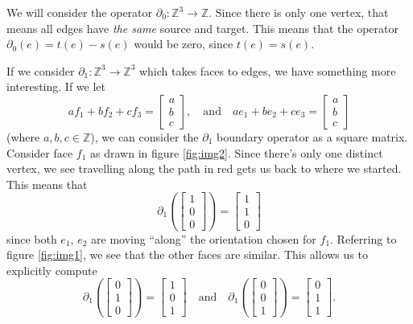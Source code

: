 We will consider the operator
$\partial_{0}:\mathbb{Z}^{3}\to\mathbb{Z}$. Since there is only
one vertex, that means all edges have \emph{the same} source and
target. This means that the operator $\partial_{0}(e)=t(e)-s(e)$
would be zero, since $t(e)=s(e)$.

If we consider $\partial_{1}:\mathbb{Z}^{3}\to\mathbb{Z}^{3}$
which takes faces to edges, we have something more interesting.
If we let
\begin{equation}%
af_{1}+bf_{2}+cf_{3} = \begin{bmatrix}a\\b\\c\end{bmatrix},\quad\text{and}\quad
ae_{1}+be_{2}+ce_{3} = \begin{bmatrix}a\\b\\c\end{bmatrix}
\end{equation}
(where $a,b,c\in\mathbb{Z}$), we can consider the $\partial_{1}$
boundary operator as a square matrix. Consider face $f_{1}$ as
drawn in figure \ref{fig:img2}. Since there's only one distinct
vertex, we see travelling along the path in red gets us back to
where we started. This means that
\begin{equation}%
\partial_{1}\left(\begin{bmatrix}1\\0\\0\end{bmatrix}\right) = \begin{bmatrix}1\\1\\0\end{bmatrix}
\end{equation}
since both $e_{1}$, $e_{2}$ are moving ``along'' the orientation
chosen for $f_{1}$. Referring to figure \ref{fig:img1}, we see
that the other faces are similar. This allows us to explicitly compute
\begin{equation}%
\partial_{1}\left(\begin{bmatrix}0\\1\\0\end{bmatrix}\right) = \begin{bmatrix}1\\0\\1\end{bmatrix}\quad\text{and}\quad
\partial_{1}\left(\begin{bmatrix}0\\0\\1\end{bmatrix}\right) = \begin{bmatrix}0\\1\\1\end{bmatrix}.
\end{equation}
